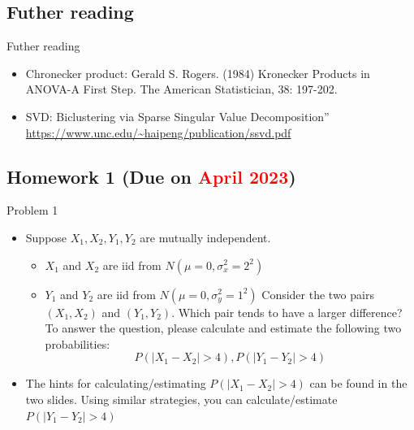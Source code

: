 \documentclass[
  ignorenonframetext,
]{beamer}
\providecommand{\tightlist}{%
  \setlength{\itemsep}{0pt}\setlength{\parskip}{0pt}}
\begin{document}
\hypertarget{futher-reading}{%
\subsection{Futher reading}\label{futher-reading}}

\begin{frame}{Futher reading}
\begin{itemize}
\tightlist
\item
  Chronecker product: Gerald S. Rogers. (1984) Kronecker Products in
  ANOVA-A First Step. The American Statistician, 38: 197-202.
\item
  SVD: Biclustering via Sparse Singular Value Decomposition''
  \url{https://www.unc.edu/~haipeng/publication/ssvd.pdf}
\end{itemize}
\end{frame}

\hypertarget{homework-1-due-on}{%
\subsection{\texorpdfstring{Homework 1 (Due on
\textcolor{red}{April 2023})}{Homework 1 (Due on )}}\label{homework-1-due-on}}

\begin{frame}{Problem 1}
\protect\hypertarget{problem-1}{}
\begin{itemize}
\tightlist
\item
  Suppose \(X_1, X_2, Y_1, Y_2\) are mutually independent.

  \begin{itemize}
  \tightlist
  \item
    \(X_1\) and \(X_2\) are iid from \(N(\mu=0, \sigma_x^2=2^2)\)
  \item
    \(Y_1\) and \(Y_2\) are iid from \(N(\mu=0, \sigma_y^2=1^2)\)
    Consider the two pairs \((X_1, X_2)\) and \((Y_1, Y_2)\). Which pair
    tends to have a larger difference? To answer the question, please
    calculate and estimate the following two probabilities:
    \[P(|X_1-X_2|>4), P(|Y_1-Y_2|>4)\]
  \end{itemize}
\item
  The hints for calculating/estimating \(P(|X_1-X_2|>4)\) can be found
  in the two slides. Using similar strategies, you can
  calculate/estimate \(P(|Y_1-Y_2|>4)\)
\end{itemize}
\end{frame}
\end{document}

